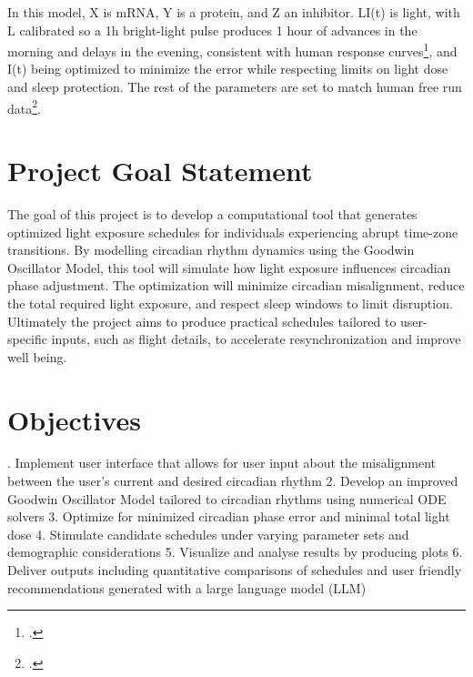 \documentclass{article}
\begin{document}
In this model, X is mRNA, Y is a protein, and Z an inhibitor. LI(t) is light, with L calibrated so a 1h bright-light pulse produces 1 hour of advances in the morning and delays in the evening, consistent with human response curves\footcite{source6}, and I(t) being optimized to minimize the error while respecting limits on light dose and sleep protection. The rest of the parameters are set to match human free run data\footcite{source7}.

\section{Project Goal Statement}
\indent The goal of this project is to develop a computational tool that generates optimized light exposure schedules for individuals experiencing abrupt time-zone transitions. By modelling circadian rhythm dynamics using the Goodwin Oscillator Model, this tool will simulate how light exposure influences circadian phase adjustment. The optimization will minimize circadian misalignment, reduce the total required light exposure, and respect sleep windows to limit disruption. Ultimately the project aims to produce practical schedules tailored to user-specific inputs, such as flight details, to accelerate resynchronization and improve well being.

\section{Objectives}
. Implement user interface that allows for user input about the misalignment between the user’s current and desired circadian rhythm
2. Develop an improved Goodwin Oscillator Model tailored to circadian rhythms using numerical ODE solvers 
3. Optimize for minimized circadian phase error and minimal total light dose
4. Stimulate candidate schedules under varying parameter sets and demographic considerations 
5. Visualize and analyse results by producing plots
6. Deliver outputs including quantitative comparisons of schedules and user friendly recommendations generated with a large language model (LLM)
\end{document}
